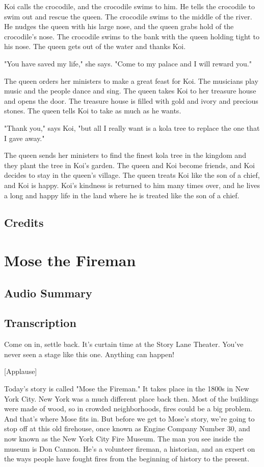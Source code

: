 Koi calls the crocodile, and the crocodile swims to him. He tells the crocodile to swim out and rescue the queen. The crocodile swims to the middle of the river. He nudges the queen with his large nose, and the queen grabs hold of the crocodile's nose. The crocodile swims to the bank with the queen holding tight to his nose. The queen gets out of the water and thanks Koi.

"You have saved my life," she says. "Come to my palace and I will reward you."

The queen orders her ministers to make a great feast for Koi. The musicians play music and the people dance and sing. The queen takes Koi to her treasure house and opens the door. The treasure house is filled with gold and ivory and precious stones. The queen tells Koi to take as much as he wants.

"Thank you," says Koi, "but all I really want is a kola tree to replace the one that I gave away."

The queen sends her ministers to find the finest kola tree in the kingdom and they plant the tree in Koi's garden. The queen and Koi become friends, and Koi decides to stay in the queen's village. The queen treats Koi like the son of a chief, and Koi is happy. Koi's kindness is returned to him many times over, and he lives a long and happy life in the land where he is treated like the son of a chief.

\subsection{Credits}

\section{Mose the Fireman}

\subsection{Audio Summary}

\subsection{Transcription}

Come on in, settle back. It's curtain time at the Story Lane Theater. You've never seen a stage like this one. Anything can happen!

[Applause]

Today's story is called "Mose the Fireman." It takes place in the 1800s in New York City. New York was a much different place back then. Most of the buildings were made of wood, so in crowded neighborhoods, fires could be a big problem. And that's where Mose fits in. But before we get to Mose's story, we're going to stop off at this old firehouse, once known as Engine Company Number 30, and now known as the New York City Fire Museum. The man you see inside the museum is Don Cannon. He's a volunteer fireman, a historian, and an expert on the ways people have fought fires from the beginning of history to the present.


